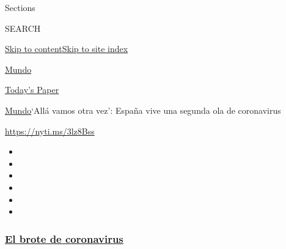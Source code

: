 Sections

SEARCH

\protect\hyperlink{site-content}{Skip to
content}\protect\hyperlink{site-index}{Skip to site index}

\href{https://www.nytimes3xbfgragh.onion/es/section/mundo}{Mundo}

\href{https://myaccount.nytimes3xbfgragh.onion/auth/login?response_type=cookie\&client_id=vi}{}

\href{https://www.nytimes3xbfgragh.onion/section/todayspaper}{Today's
Paper}

\href{/es/section/mundo}{Mundo}\textbar{}`Allá vamos otra vez': España
vive una segunda ola de coronavirus

\url{https://nyti.ms/3lz8Bss}

\begin{itemize}
\item
\item
\item
\item
\item
\item
\end{itemize}

\hypertarget{el-brote-de-coronavirus}{%
\subsubsection{\texorpdfstring{\href{https://www.nytimes3xbfgragh.onion/es/spotlight/coronavirus?name=styln-coronavirus-es\&region=TOP_BANNER\&block=storyline_menu_recirc\&action=click\&pgtype=Article\&impression_id=bfd38190-efb5-11ea-9d10-87f4af94003e\&variant=undefined}{El
brote de
coronavirus}}{El brote de coronavirus}}\label{el-brote-de-coronavirus}}

